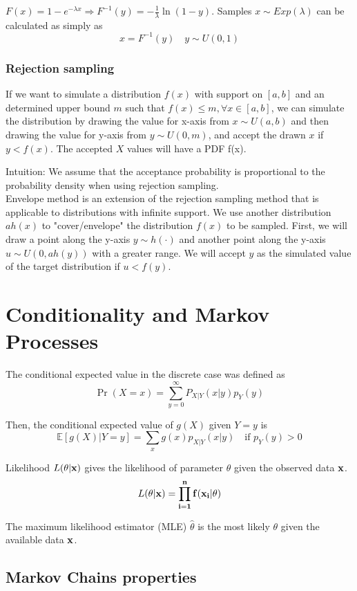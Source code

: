 \documentclass[letterpaper, 12pt]{article}
\newcommand{\myexample}[2]{
    \begin{tcolorbox}[colback=black!5!white,colframe=black,title={Example: #1},
    before skip=12pt]
        #2
    \end{tcolorbox}
}
\newcommand{\E}{\mathbb{E}} %
\newcommand{\1}{\mathds{1}} %
\theoremstyle{definition}
\begin{document}
\myexample{Sampling exponential random variates using y \sim U(0, 1)}
{
$F(x) = 1 - e^{-\lambda x} \Rightarrow F^{-1}(y) = -\frac1\lambda \ln(1-y)$.
Samples $x \sim Exp(\lambda)$ can be calculated as simply as
\[
  x = F^{-1}(y) \quad y \sim U(0, 1)
\]
}
\subsubsection{Rejection sampling}

If we want to simulate a distribution $f(x)$ with support on $[a, b]$ and an determined upper bound $m$ such that $f(x) \leq m, \forall x \in [a, b]$, we can simulate the distribution by drawing the value for x-axis from $x \sim U(a,b)$ and then drawing the value for y-axis from $y \sim U(0, m)$, and accept the drawn $x$ if $y < f(x)$. The accepted $X$ values will have a PDF f(x).

Intuition: We assume that the acceptance probability is proportional to the probability density when using rejection sampling. \\

Envelope method is an extension of the rejection sampling method that is applicable to distributions with infinite support. We use another distribution $ah(x)$ to "cover/envelope" the distribution $f(x)$ to be sampled. First, we will draw a point along the y-axis $y \sim h(\cdot)$ and another point along the y-axis $u\sim U(0, ah(y))$ with a greater range. We will accept $y$ as the simulated value of the target distribution if $u < f(y)$.


\section{Conditionality and Markov Processes}

The conditional expected value in the discrete case was defined as
\[
  \Pr(X=x) = \sum_{y=0}^\infty P_{X|Y}(x|y)p_Y(y)
\]

Then, the conditional expected value of $g(X)$ given $Y=y$ is
\[
  \E[g(X) | Y=y] = \sum_x g(x) p_{X|Y}(x|y) \quad \text{if } p_Y(y) > 0
\]

Likelihood $L(\theta | \bf{x})$ gives the likelihood of parameter $\theta$ given the observed data $\bf{x}$.
\[
  L(\theta | \bf{x}) = \prod_{i=1}^n f(x_i | \theta)
\]

The maximum likelihood estimator (MLE) $\hat{\theta}$ is the most likely $\theta$ given the available data $\bf{x}$.

\subsection{Markov Chains properties}
\end{document}
